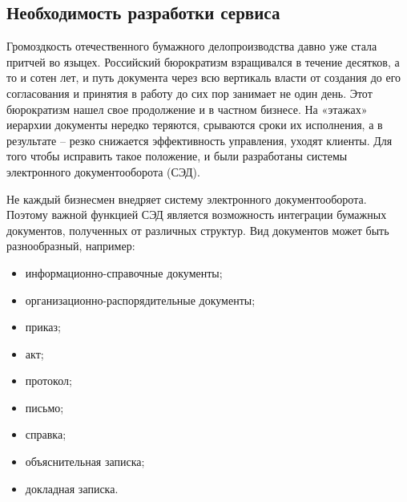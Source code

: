 \subsection{Необходимость разработки сервиса}

Громоздкость отечественного бумажного делопроизводства давно уже стала притчей во языцех. Российский бюрократизм взращивался в течение десятков, а то и сотен лет, и путь документа через всю вертикаль власти от создания до его согласования и принятия в работу до сих пор занимает не один день. Этот бюрократизм нашел свое продолжение и в частном бизнесе. На «этажах» иерархии документы нередко теряются, срываются сроки их исполнения, а в результате – резко снижается эффективность управления, уходят клиенты. Для того чтобы исправить такое положение, и были разработаны системы электронного документооборота (СЭД).

Не каждый бизнесмен внедряет систему электронного документооборота. Поэтому важной функцией СЭД является возможность интеграции бумажных документов, полученных от различных структур. Вид документов может быть разнообразный, например:
\begin{itemize}
  \item информационно-справочные документы;
  \item организационно-распорядительные документы;
  \item приказ;
  \item акт;
  \item протокол;
  \item письмо;
  \item справка;
  \item объяснительная записка;
  \item докладная записка.
\end{itemize}

